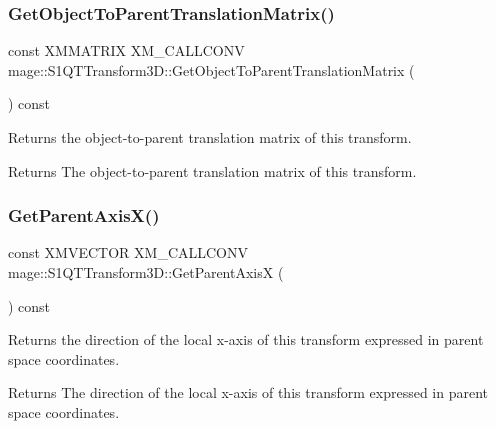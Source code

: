 \subsubsection{\texorpdfstring{Get\+Object\+To\+Parent\+Translation\+Matrix()}{GetObjectToParentTranslationMatrix()}}
{\footnotesize\ttfamily const X\+M\+M\+A\+T\+R\+IX X\+M\+\_\+\+C\+A\+L\+L\+C\+O\+NV mage\+::\+S1\+Q\+T\+Transform3\+D\+::\+Get\+Object\+To\+Parent\+Translation\+Matrix (\begin{DoxyParamCaption}{ }\end{DoxyParamCaption}) const\hspace{0.3cm}{\ttfamily [noexcept]}}

Returns the object-\/to-\/parent translation matrix of this transform.

\begin{DoxyReturn}{Returns}
The object-\/to-\/parent translation matrix of this transform. 
\end{DoxyReturn}
\mbox{\label{classmage_1_1_s1_q_t_transform3_d_ac231197ac3cf542642c33e6c7728dd50}} 
\subsubsection{\texorpdfstring{Get\+Parent\+Axis\+X()}{GetParentAxisX()}}
{\footnotesize\ttfamily const X\+M\+V\+E\+C\+T\+OR X\+M\+\_\+\+C\+A\+L\+L\+C\+O\+NV mage\+::\+S1\+Q\+T\+Transform3\+D\+::\+Get\+Parent\+AxisX (\begin{DoxyParamCaption}{ }\end{DoxyParamCaption}) const\hspace{0.3cm}{\ttfamily [noexcept]}}

Returns the direction of the local x-\/axis of this transform expressed in parent space coordinates.

\begin{DoxyReturn}{Returns}
The direction of the local x-\/axis of this transform expressed in parent space coordinates. 
\end{DoxyReturn}
\mbox{\label{classmage_1_1_s1_q_t_transform3_d_a5cbba8b2f6a1acd1918ddd77911a7fb1}} 
